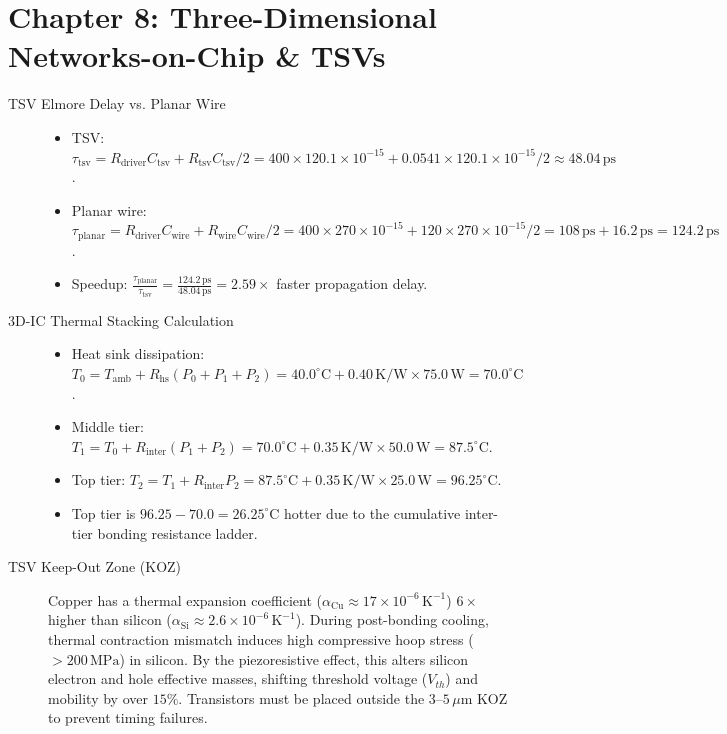 \section*{Chapter 8: Three-Dimensional Networks-on-Chip \& TSVs}

\begin{description}
    \item[TSV Elmore Delay vs. Planar Wire]
    \begin{itemize}
        \item TSV: $\tau_{\mathrm{tsv}} = R_{\mathrm{driver}} C_{\mathrm{tsv}} + R_{\mathrm{tsv}} C_{\mathrm{tsv}} / 2 = 400 \times 120.1 \times 10^{-15} + 0.0541 \times 120.1 \times 10^{-15} / 2 \approx \mathbf{48.04\,\mathrm{ps}}$.
        \item Planar wire: $\tau_{\mathrm{planar}} = R_{\mathrm{driver}} C_{\mathrm{wire}} + R_{\mathrm{wire}} C_{\mathrm{wire}} / 2 = 400 \times 270 \times 10^{-15} + 120 \times 270 \times 10^{-15} / 2 = 108\,\mathrm{ps} + 16.2\,\mathrm{ps} = \mathbf{124.2\,\mathrm{ps}}$.
        \item Speedup: $\frac{\tau_{\mathrm{planar}}}{\tau_{\mathrm{tsv}}} = \frac{124.2\,\mathrm{ps}}{48.04\,\mathrm{ps}} = \mathbf{2.59\times}$ faster propagation delay.
    \end{itemize}

    \item[3D-IC Thermal Stacking Calculation]
    \begin{itemize}
        \item Heat sink dissipation: $T_0 = T_{\mathrm{amb}} + R_{\mathrm{hs}} (P_0 + P_1 + P_2) = 40.0^\circ\mathrm{C} + 0.40\,\mathrm{K/W} \times 75.0\,\mathrm{W} = \mathbf{70.0^\circ\mathrm{C}}$.
        \item Middle tier: $T_1 = T_0 + R_{\mathrm{inter}} (P_1 + P_2) = 70.0^\circ\mathrm{C} + 0.35\,\mathrm{K/W} \times 50.0\,\mathrm{W} = \mathbf{87.5^\circ\mathrm{C}}$.
        \item Top tier: $T_2 = T_1 + R_{\mathrm{inter}} P_2 = 87.5^\circ\mathrm{C} + 0.35\,\mathrm{K/W} \times 25.0\,\mathrm{W} = \mathbf{96.25^\circ\mathrm{C}}$.
        \item Top tier is $96.25 - 70.0 = \mathbf{26.25^\circ\mathrm{C}}$ hotter due to the cumulative inter-tier bonding resistance ladder.
    \end{itemize}

    \item[TSV Keep-Out Zone (KOZ)] Copper has a thermal expansion coefficient ($\alpha_{\mathrm{Cu}} \approx 17 \times 10^{-6}\,\mathrm{K^{-1}}$) $6\times$ higher than silicon ($\alpha_{\mathrm{Si}} \approx 2.6 \times 10^{-6}\,\mathrm{K^{-1}}$). During post-bonding cooling, thermal contraction mismatch induces high compressive hoop stress ($>200\,\mathrm{MPa}$) in silicon. By the piezoresistive effect, this alters silicon electron and hole effective masses, shifting threshold voltage ($V_{th}$) and mobility by over $15\%$. Transistors must be placed outside the $3$--$5\,\mu\mathrm{m}$ KOZ to prevent timing failures.


\end{description}
